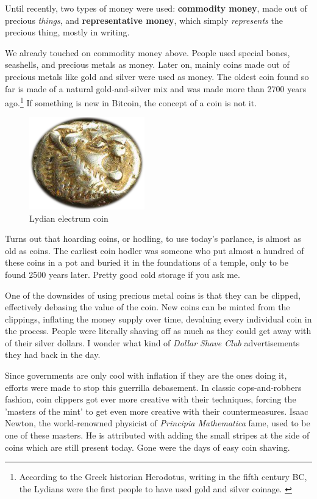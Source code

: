 Until recently, two types of money were used: \textbf{commodity money}, made
out of precious \textit{things}, and \textbf{representative money}, which simply
\textit{represents} the precious thing, mostly in writing.

We already touched on commodity money above. People used special bones,
seashells, and precious metals as money. Later on, mainly coins made out of
precious metals like gold and silver were used as money. The oldest coin found
so far is made of a natural gold-and-silver mix and was made more than 2700
years ago.\footnote{According to the Greek historian Herodotus, writing in the
fifth century BC, the Lydians were the first people to have used gold and silver
coinage. \cite{coinage-origins}} If something is new in Bitcoin, the concept of
a coin is not it.

\begin{figure}
  \centering
  \includegraphics[width=5cm]{assets/images/lydian-coin-stater.png}
  \caption{Lydian electrum coin}
  \label{fig:lydian-coin-stater}
\end{figure}

Turns out that hoarding coins, or hodling, to use today's parlance, is
almost as old as coins. The earliest coin hodler was someone who put
almost a hundred of these coins in a pot and buried it in the
foundations of a temple, only to be found 2500 years later. Pretty good
cold storage if you ask me.

One of the downsides of using precious metal coins is that they can be
clipped, effectively debasing the value of the coin. New coins can be
minted from the clippings, inflating the money supply over time,
devaluing every individual coin in the process. People were literally
shaving off as much as they could get away with of their silver dollars.
I wonder what kind of \textit{Dollar Shave Club} advertisements they had back
in the day.

Since governments are only cool with inflation if they are the ones
doing it, efforts were made to stop this guerrilla debasement. In
classic cops-and-robbers fashion, coin clippers got ever more creative
with their techniques, forcing the 'masters of the mint' to get even
more creative with their countermeasures. Isaac Newton, the
world-renowned physicist of \textit{Principia Mathematica} fame, used to be one
of these masters. He is attributed with adding the small stripes at the
side of coins which are still present today. Gone were the days of easy
coin shaving.

